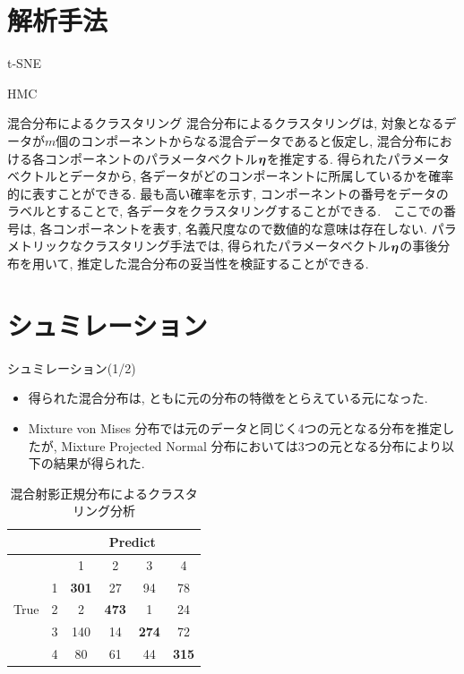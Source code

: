 \documentclass[dvipdfmx]{beamer} %
\newcommand{\bm}[1]{\mbox{\boldmath $#1$}}
\begin{document}
\section{解析手法}
\begin{frame}{t-SNE}

\end{frame}

\begin{frame}{HMC}

\end{frame}

\begin{frame}{混合分布によるクラスタリング}
混合分布によるクラスタリングは, 対象となるデータが$m$個のコンポーネントからなる混合データであると仮定し, 混合分布における各コンポーネントのパラメータベクトル$\bm \eta$を推定する. 得られたパラメータベクトルとデータから, 各データがどのコンポーネントに所属しているかを確率的に表すことができる. 最も高い確率を示す, コンポーネントの番号をデータのラベルとすることで, 各データをクラスタリングすることができる.　ここでの番号は, 各コンポーネントを表す, 名義尺度なので数値的な意味は存在しない. パラメトリックなクラスタリング手法では, 得られたパラメータベクトル$\bm \eta$の事後分布を用いて, 推定した混合分布の妥当性を検証することができる.	
\end{frame}

\section{シュミレーション}
\begin{frame}{シュミレーション(1/2)}

\begin{itemize}
\item
得られた混合分布は, ともに元の分布の特徴をとらえている元になった.

\item
Mixture von Mises 分布では元のデータと同じく4つの元となる分布を推定したが, Mixture Projected Normal 分布においては3つの元となる分布により以下の結果が得られた.

\end{itemize}

\begin{table}[tbp]
\begin{center}
\caption{混合射影正規分布によるクラスタリング分析}
\label{cross}
\begin{tabular}{c|c|c c c c}
\hline
 &  & \multicolumn{4}{c}{Predict} \\ \hline
 &  & 1 & 2 & 3 & 4  \\ \hline 
 & 1 &  \textbf{301} & 27  & 94 & 78 \\ 
True
 & 2 & 2 & \textbf{473} & 1 & 24 \\
 & 3 & 140 & 14 & \textbf{274} &72 \\ 
 & 4 & 80 & 61 & 44 & \textbf{315} \\ 
\hline
\end{tabular}
\end{center}
\end{table}
\end{frame}
\end{document}
